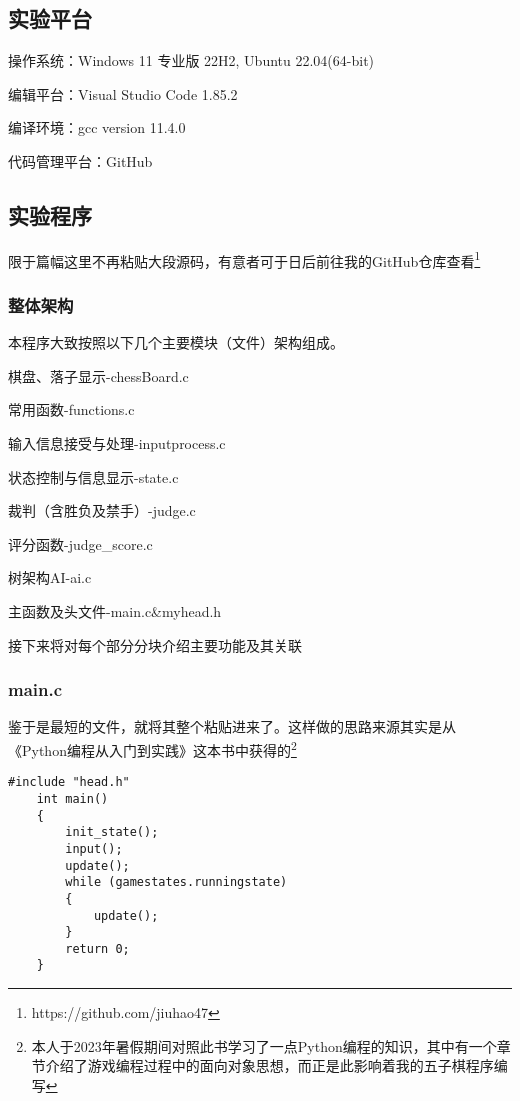 	\subsection{实验平台}
	\begin{compactitem}
		\item 操作系统：Windows 11 专业版 22H2, Ubuntu 22.04(64-bit)
		\item 编辑平台：Visual Studio Code 1.85.2
		\item 编译环境：gcc version 11.4.0
		\item 代码管理平台：GitHub
	\end{compactitem}
	
	\subsection{实验程序}
	限于篇幅这里不再粘贴大段源码，有意者可于日后前往我的GitHub仓库查看\footnote{https://github.com/jiuhao47}
	\subsubsection{整体架构}
	本程序大致按照以下几个主要模块（文件）架构组成。
	\begin{compactitem}
		\item 棋盘、落子显示-chessBoard.c
		\item 常用函数-functions.c
		\item 输入信息接受与处理-inputprocess.c
		\item 状态控制与信息显示-state.c
		\item 裁判（含胜负及禁手）-judge.c
		\item 评分函数-judge\_score.c
		\item 树架构AI-ai.c
		\item 主函数及头文件-main.c\&myhead.h
	\end{compactitem}
	
	接下来将对每个部分分块介绍主要功能及其关联
	\subsubsection{main.c}
	鉴于是最短的文件，就将其整个粘贴进来了。这样做的思路来源其实是从《Python编程从入门到实践》这本书中获得的\footnote{本人于2023年暑假期间对照此书学习了一点Python编程的知识，其中有一个章节介绍了游戏编程过程中的面向对象思想，而正是此影响着我的五子棋程序编写}
	\begin{lstlisting}[style=c]
	#include "head.h"
	int main()
	{
		init_state();
		input();
		update();
		while (gamestates.runningstate)
		{
			update();
		}
		return 0;
	}
	\end{lstlisting}
	
